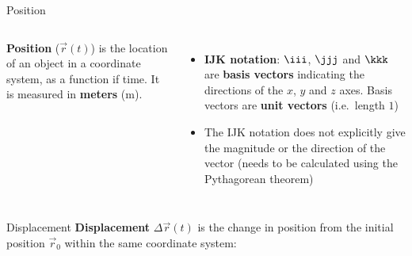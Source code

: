 \documentclass[12pt,compress,aspectratio=169,dvipsnames]{beamer}
\begin{document}
\begin{frame}{Position}
  \begin{columns}
    \textbf{Position} ($\vec r(t)$) is the location of an object in a coordinate
    system, as a function if time. It is measured in \textbf{meters}
    (\si{\metre}).

    \begin{itemize}
    \item\textbf{IJK notation}: $\iii$, $\jjj$ and $\kkk$ are \textbf{basis
      vectors} indicating the directions of the $x$, $y$ and $z$ axes. Basis
      vectors are \textbf{unit vectors} (i.e.\ length $1$)
    \item The IJK notation does not explicitly give the magnitude or the
      direction of the vector (needs to be calculated using the Pythagorean
      theorem)
    \end{itemize}

  \end{columns}
\end{frame}



\begin{frame}{Displacement}
  \textbf{Displacement} $\Delta\vec r(t)$ is the change in position from the
  initial position $\vec r_0$ within the same coordinate system:

\end{frame}
\end{document}
